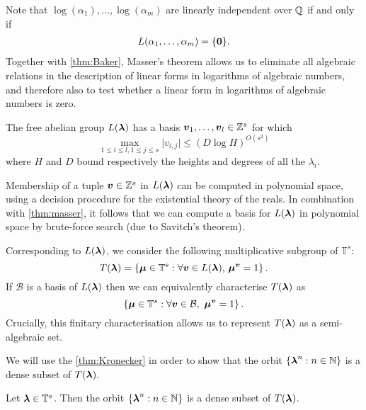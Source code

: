 Note that $\log(\alpha_{1}), \ldots, \log(\alpha_{m})$ are linearly independent over $\mathbb{Q}$ if and only if
\begin{align*}
L(\alpha_{1}, \ldots, \alpha_{m}) = \lbrace \boldsymbol{0} \rbrace .
\end{align*}
Together with \cref{thm:Baker}, Masser's theorem allows us to eliminate all algebraic relations in the description of linear forms in logarithms of algebraic numbers, and therefore also to test whether a linear form in logarithms of algebraic numbers is zero.

\begin{theorem}[Masser]
\label{thm:masser}
The free abelian group $L(\boldsymbol{\lambda})$ has a basis $\boldsymbol{v}_1, \ldots, \boldsymbol{v}_{l} \in \mathbb{Z}^{s}$ for which
\[ \max\limits_{1\leq i\leq l,1\leq j\leq s} \lvert v_{i,j} \rvert \leq (D\log H)^{O(s^2)} \]
where $H$ and $D$ bound respectively the heights and degrees of all the $\lambda_{i}$.
\end{theorem}
Membership of a tuple $\boldsymbol{v}\in \mathbb{Z}^{s}$ in $L(\boldsymbol{\lambda})$ can be computed in polynomial space, using a decision procedure for the existential theory of the reals. In combination with \cref{thm:masser}, it follows that we can compute a basis for $L(\boldsymbol{\lambda})$ in polynomial space by brute-force search (due to Savitch's theorem).

Corresponding to $L(\boldsymbol{\lambda})$, we consider the following
multiplicative subgroup of $\mathbb{T}^{s}$:
\begin{equation*}
T(\boldsymbol{\lambda})=\lbrace \boldsymbol{\mu} \in \mathbb{T}^{s} : \forall \boldsymbol{v} \in L(\boldsymbol{\lambda}), \, \boldsymbol{\mu}^{\boldsymbol{v}} = 1 \rbrace \, .
\end{equation*}
If $\mathcal{B}$ is a basis of $L(\boldsymbol{\lambda})$ then we can
equivalently characterise $T(\boldsymbol{\lambda})$ as
\begin{equation*}
\lbrace \boldsymbol{\mu} \in \mathbb{T}^{s}: \forall \boldsymbol{v} \in \mathcal{B}, \, \, \boldsymbol{\mu}^{\boldsymbol{v}} = 1 \rbrace \, .
\end{equation*}
Crucially, this finitary characterisation allows us to represent $T(\boldsymbol\lambda)$ as a semi-algebraic set.

We will use the \cref{thm:Kronecker} in order to show that the orbit $\lbrace
\boldsymbol\lambda^n : n\in\mathbb{N} \rbrace$ is a dense subset of
$T(\boldsymbol{\lambda})$.

\begin{theorem}
\label{dense}
Let $\boldsymbol{\lambda}\in\mathbb{T}^s$. Then the orbit $\lbrace \boldsymbol\lambda^n : n\in\mathbb{N} \rbrace$ is a dense subset of $T(\boldsymbol{\lambda})$.
\end{theorem}

